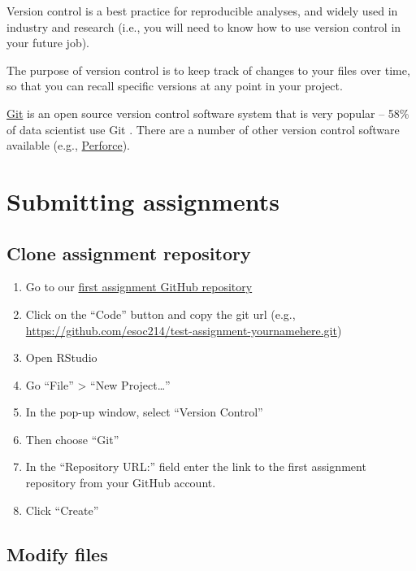 \documentclass[
]{book}
\begin{document}
Version control is a best practice for reproducible analyses, and widely used in industry and research (i.e., you will need to know how to use version control in your future job).

The purpose of version control is to keep track of changes to your files over time, so that you can recall specific versions at any point in your project.

\href{https://git-scm.com/}{Git} is an open source version control software system that is very popular -- 58\% of data scientist use Git \citep{beckman2020implementing}. There are a number of other version control software available (e.g., \href{https://www.perforce.com/blog/vcs/git-vs-perforce-how-choose-and-when-use-both}{Perforce}).

\hypertarget{submitting-assignments}{%
\section{Submitting assignments}\label{submitting-assignments}}

\hypertarget{clone-assignment-repository}{%
\subsection{Clone assignment repository}\label{clone-assignment-repository}}

\begin{enumerate}
\def\labelenumi{\arabic{enumi}.}
\item
  Go to our \href{https://classroom.github.com/a/uE1b8ho7}{first assignment GitHub repository}
\item
  Click on the ``Code'' button and copy the git url (e.g., \url{https://github.com/esoc214/test-assignment-yournamehere.git})
\item
  Open RStudio
\item
  Go ``File'' \textgreater{} ``New Project\ldots{}''
\item
  In the pop-up window, select ``Version Control''
\item
  Then choose ``Git''
\item
  In the ``Repository URL:'' field enter the link to the first assignment repository from your GitHub account.
\item
  Click ``Create''
\end{enumerate}

\hypertarget{modify-files}{%
\subsection{Modify files}\label{modify-files}}
\end{document}
